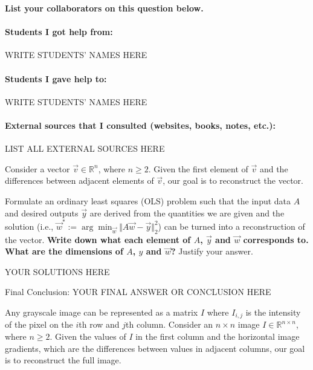 
\textbf{List your collaborators on this question below. }

\begin{solution}

\paragraph{Students I got help from:} WRITE STUDENTS' NAMES HERE

\paragraph{Students I gave help to:} WRITE STUDENTS' NAMES HERE

\paragraph{External sources that I consulted (websites, books, notes, etc.):} LIST ALL EXTERNAL SOURCES HERE

\end{solution}

\qpart{[5 points]} 

Consider a vector $\vec{v} \in \mathbb{R}^{n}$, where $n \geq 2$. Given the first element of $\vec{v}$ and the differences between adjacent elements of $\vec{v}$, our goal is to reconstruct the vector. 

Formulate an ordinary least squares (OLS) problem such that the input data $A$ and desired outputs $\vec{y}$ are derived from the quantities we are given and the solution (i.e., $\vec{w}^* := \arg\min_{\vec{w}} \Vert A\vec{w} - \vec{y} \Vert_2^2$) can be turned into a reconstruction of the vector. \textbf{Write down what each element of $A$, $\vec{y}$ and $\vec{w}$ corresponds to. What are the dimensions of $A$, $y$ and $\vec{w}$?} Justify your answer. 

\begin{solution}

YOUR SOLUTIONS HERE

{\color{red} Final Conclusion: YOUR FINAL ANSWER OR CONCLUSION HERE}

\end{solution}

\qpart{[5 points]} 

Any grayscale image can be represented as a matrix $I$ where $I_{i,j}$ is the intensity of the pixel on the $i$th row and $j$th column. Consider an $n\times n$ image $I \in \mathbb{R}^{n \times n}$, where $n \geq 2$. Given the values of $I$ in the first column and the horizontal image gradients, which are the differences between values in adjacent columns, our goal is to reconstruct the full image. 

